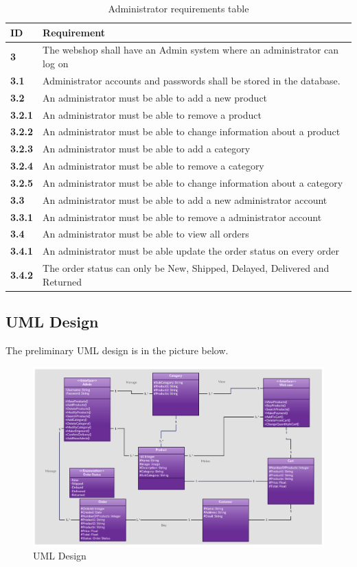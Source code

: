 \documentclass[a4paper,12pt]{article}
\begin{document}
\begin{table}[htpb]
	\centering
	\caption{Administrator requirements table}
	\label{my-label}
	\begin{tabular}{|l|l|}
		\hline
		\textbf{ID}    & \textbf{Requirement}                                                       \\ \hline
		\textbf{3}     & The webshop shall have an Admin system where an administrator can log on   \\ \hline
		\textbf{3.1}   & Administrator accounts and passwords shall be stored in the database.      \\ \hline
		\textbf{3.2}   & An administrator must be able to add a new product                         \\ \hline
		\textbf{3.2.1} & An administrator must be able to remove a product                          \\ \hline
		\textbf{3.2.2} & An administrator must be able to change information about a product        \\ \hline
		\textbf{3.2.3} & An administrator must be able to add a category                            \\ \hline
		\textbf{3.2.4} & An administrator must be able to remove a category                         \\ \hline
		\textbf{3.2.5} & An administrator must be able to change information about a category       \\ \hline
		\textbf{3.3}   & An administrator must be able to add a new administrator account           \\ \hline
		\textbf{3.3.1} & An administrator must be able to remove a administrator account            \\ \hline
		\textbf{3.4}   & An administrator must be able to view all orders                           \\ \hline
		\textbf{3.4.1} & An administrator must be able update the order status on every order       \\ \hline
		\textbf{3.4.2} & The order status can only be New, Shipped, Delayed, Delivered and Returned \\ \hline
	\end{tabular}
\end{table}

\subsection{UML Design}
The preliminary UML design is in the picture below.
\begin{figure}[htbp]
	\caption{UML Design}
	\includegraphics[width=\textwidth,height=\textheight,keepaspectratio]{img/UML.png}
\end{figure}
\end{document}
